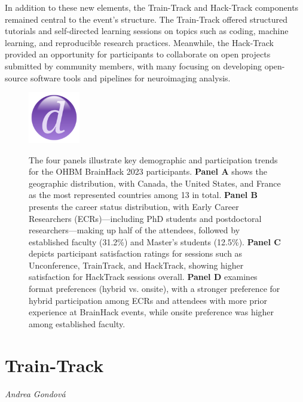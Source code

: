 \documentclass{article}
\newcommand\coordinator[1]{\begin{flushleft}\small\textit{#1}\end{flushleft}}
\begin{document}
In addition to these new elements, the Train-Track and Hack-Track components remained central to the event's structure.
The Train-Track offered structured tutorials and self-directed learning sessions on topics such as coding, machine learning, and reproducible research practices.
Meanwhile, the Hack-Track provided an opportunity for participants to collaborate on open projects submitted by community members, with many focusing on developing open-source software tools and pipelines for neuroimaging analysis.

\begin{figure}[h]
    \centering
    \includegraphics[width=0.2\textwidth]{images/placeholder.png}
    \label{fig:demographics}
    \caption{
        The four panels illustrate key demographic and participation trends for the OHBM BrainHack 2023 participants.
        \textbf{Panel A} shows the geographic distribution, with Canada, the United States, and France as the most represented countries among 13 in total.
        \textbf{Panel B} presents the career status distribution, with Early Career Researchers (ECRs)—including PhD students and postdoctoral researchers—making up half of the attendees, followed by established faculty (31.2\%) and Master's students (12.5\%).
        \textbf{Panel C} depicts participant satisfaction ratings for sessions such as Unconference, TrainTrack, and HackTrack, showing higher satisfaction for HackTrack sessions overall.
        \textbf{Panel D} examines format preferences (hybrid vs. onsite), with a stronger preference for hybrid participation among ECRs and attendees with more prior experience at BrainHack events, while onsite preference was higher among established faculty.
    }
\end{figure}

\section{Train-Track}
\coordinator{Andrea Gondová}
\end{document}
